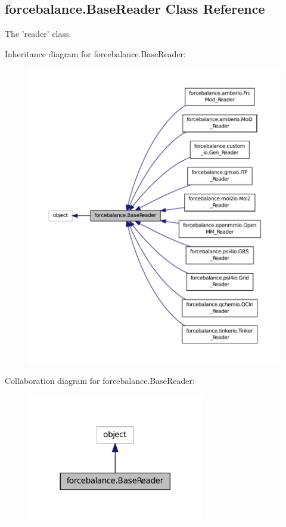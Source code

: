 \hypertarget{classforcebalance_1_1BaseReader}{\subsection{forcebalance.\-Base\-Reader Class Reference}
\label{classforcebalance_1_1BaseReader}
}


The 'reader' class.  




Inheritance diagram for forcebalance.\-Base\-Reader\-:
\nopagebreak
\begin{figure}[H]
\begin{center}
\leavevmode
\includegraphics[width=350pt]{classforcebalance_1_1BaseReader__inherit__graph}
\end{center}
\end{figure}


Collaboration diagram for forcebalance.\-Base\-Reader\-:
\nopagebreak
\begin{figure}[H]
\begin{center}
\leavevmode
\includegraphics[width=218pt]{classforcebalance_1_1BaseReader__coll__graph}
\end{center}
\end{figure}
